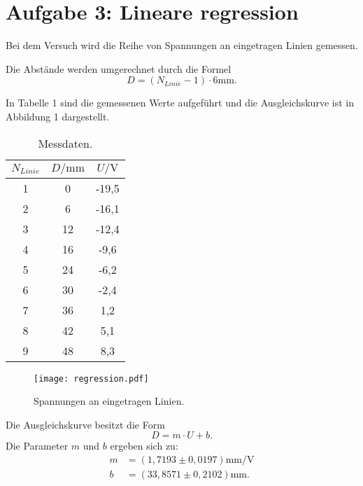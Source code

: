 \section{Aufgabe 3: Lineare regression}
\label{sec:Aufgabe 3} 


Bei dem Versuch wird die Reihe von Spannungen an eingetragen Linien gemessen. 

Die Abstände werden umgerechnet durch die Formel
\begin{equation}
  D = (N_{Linie}-1) \cdot 6  \mathrm{mm}.
\end{equation}



In Tabelle 1 sind die gemessenen Werte aufgeführt und die Ausgleichskurve ist in Abbildung 1 dargestellt.
\begin{table}
  \centering
  \caption{Messdaten.}
  \label{tab:some_data}
  \begin{tabular}{ccc}
    \toprule
    $N_{Linie}$ & $D /   \mathrm{mm}$  & $U /  \mathrm{V} $\\
    \midrule
    1 & 0 & -19,5 \\
    2 & 6 & -16,1 \\
    3 & 12 & -12,4 \\
    4 & 16 & -9,6\\
    5 & 24 & -6,2 \\
    6 & 30 & -2,4 \\
    7 & 36 & 1,2 \\
    8 & 42 & 5,1 \\
    9 & 48 & 8,3 \\

    \bottomrule
  \end{tabular}
\end{table}

\begin{figure}
  \centering
  \texttt{[image: regression.pdf]}
  \caption{Spannungen an eingetragen Linien.}
  \label{fig:regression}
\end{figure}

Die Ausgleichskurve besitzt die Form
\begin{equation}
  D= m \cdot U +b .
\end{equation} 
Die Parameter $m$ und $b$ ergeben sich zu:
\begin{align*}
  m &= (1,7193 \pm 0,0197)  \si{\milli\meter\per\volt}    \\
  b &= (33,8571 \pm 0,2102 )  \si{\milli\meter} .\\
\end{align*}


